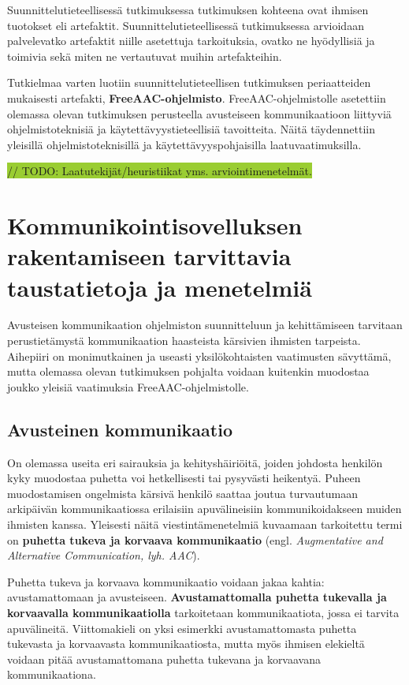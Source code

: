 \documentclass[utf8]{gradu3}
\begin{document}
Suunnittelutieteellisessä tutkimuksessa tutkimuksen kohteena ovat ihmisen tuotokset eli artefaktit. Suunnittelutieteellisessä tutkimuksessa arvioidaan palvelevatko artefaktit niille asetettuja tarkoituksia, ovatko ne hyödyllisiä ja toimivia sekä miten ne vertautuvat muihin artefakteihin.

Tutkielmaa varten luotiin suunnittelutieteellisen tutkimuksen periaatteiden mukaisesti artefakti, \textbf{FreeAAC-ohjelmisto}. FreeAAC-ohjelmistolle asetettiin olemassa olevan tutkimuksen perusteella avusteiseen kommunikaatioon liittyviä ohjelmistoteknisiä ja käytettävyystieteellisiä tavoitteita. Näitä täydennettiin yleisillä ohjelmistoteknisillä ja käytettävyyspohjaisilla laatuvaatimuksilla.

\colorbox{YellowGreen}{// TODO: Laatutekijät/heuristiikat yms. arviointimenetelmät.}

\chapter{Kommunikointisovelluksen rakentamiseen tarvittavia taustatietoja ja menetelmiä}

Avusteisen kommunikaation ohjelmiston suunnitteluun ja kehittämiseen tarvitaan perustietämystä kommunikaation haasteista kärsivien ihmisten tarpeista. Aihepiiri on monimutkainen ja useasti yksilökohtaisten vaatimusten sävyttämä, mutta olemassa olevan tutkimuksen pohjalta voidaan kuitenkin muodostaa joukko yleisiä vaatimuksia FreeAAC-ohjelmistolle.

\section{Avusteinen kommunikaatio}

On olemassa useita eri sairauksia ja kehityshäiriöitä, joiden johdosta henkilön kyky muodostaa puhetta voi hetkellisesti tai pysyvästi heikentyä. Puheen muodostamisen ongelmista kärsivä henkilö saattaa joutua turvautumaan arkipäivän kommunikaatiossa erilaisiin apuvälineisiin kommunikoidakseen muiden ihmisten kanssa. Yleisesti näitä viestintämenetelmiä kuvaamaan tarkoitettu termi on \textbf{puhetta tukeva ja korvaava kommunikaatio} (engl. \textit{Augmentative and Alternative Communication, lyh. AAC}).

Puhetta tukeva ja korvaava kommunikaatio voidaan jakaa kahtia: avustamattomaan ja avusteiseen. \textbf{Avustamattomalla puhetta tukevalla ja korvaavalla kommunikaatiolla} tarkoitetaan kommunikaatiota, jossa ei tarvita apuvälineitä. Viittomakieli on yksi esimerkki avustamattomasta puhetta tukevasta ja korvaavasta kommunikaatiosta, mutta myös ihmisen elekieltä voidaan pitää avustamattomana puhetta tukevana ja korvaavana kommunikaationa. 
\end{document}

